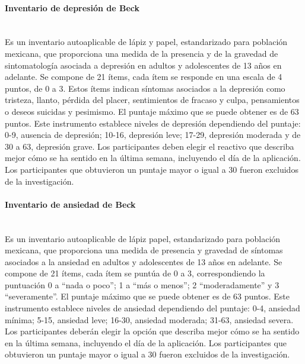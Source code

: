 \documentclass[12pt,letterpaper,final]{article}
\let\cite\cite %
\begin{document}
\paragraph[Inventario de depresión de Beck]{Inventario de depresión de Beck \cite{Jurado1998}} \mbox{}\\
Es un inventario autoaplicable de lápiz y papel, estandarizado para población mexicana, que proporciona una medida de la presencia y de la gravedad de sintomatología asociada a depresión en adultos y adolescentes de 13 años en adelante. Se compone de 21 ítems, cada ítem se responde en una escala de 4 puntos, de 0 a 3. Estos ítems indican síntomas asociados a la depresión como tristeza, llanto, pérdida del placer, sentimientos de fracaso y culpa, pensamientos o deseos suicidas y pesimismo. El puntaje máximo que se puede obtener es de 63 puntos. Este instrumento establece niveles de depresión dependiendo del puntaje: 0-9, ausencia de depresión; 10-16, depresión leve; 17-29, depresión moderada y de 30 a 63, depresión grave. Los participantes deben elegir el reactivo que describa mejor cómo se ha sentido en la última semana, incluyendo el día de la aplicación. Los participantes que obtuvieron un puntaje mayor o igual a 30 fueron excluidos de la investigación.

\paragraph[Inventario de ansiedad de Beck]{Inventario de ansiedad de Beck \cite{Robles2001}} \mbox{}\\
Es un inventario autoaplicable de lápiz papel,  estandarizado para población mexicana, que proporciona una medida de presencia y gravedad de síntomas asociados a la ansiedad en adultos y adolescentes de 13 años en adelante. Se compone de 21 ítems, cada ítem se puntúa de 0 a 3, correspondiendo la puntuación 0 a “nada o poco”; 1 a “más o menos”; 2 “moderadamente” y 3 “severamente”.  El puntaje máximo que se puede obtener es de 63 puntos. Este instrumento establece niveles de ansiedad dependiendo del puntaje: 0-4, ansiedad mínima; 5-15, ansiedad leve; 16-30, ansiedad moderada; 31-63, ansiedad severa. Los participantes deberán elegir  la opción que describa mejor cómo se ha sentido en la última semana, incluyendo el día de la aplicación. Los participantes que obtuvieron un puntaje mayor o igual a 30 fueron excluidos de la investigación.
\end{document}
